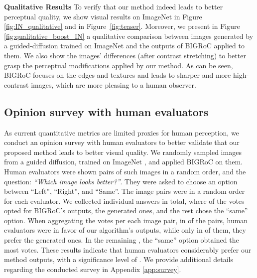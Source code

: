 \documentclass[10pt]{article} \usepackage[accepted]{tmlr}
\begin{document}
\noindent \textbf{Qualitative Results} To verify that our method indeed leads to better perceptual quality, we show visual results on ImageNet  in Figure \ref{fig:IN_qualitative} and in Figure~\ref{fig:teaser}. Moreover, we present in Figure \ref{fig:qualitative_boost_IN} a qualitative comparison between images generated by a guided-diffusion trained on ImageNet  and the outputs of BIGRoC applied to them. We also show the images' differences (after contrast stretching) to better grasp the perceptual modifications applied by our method. As can be seen, BIGRoC focuses on the edges and textures and leads to sharper and more high-contrast images, which are more pleasing to a human observer.



\subsection{Opinion survey with human evaluators}
As current quantitative metrics are limited proxies for human perception, we conduct an opinion survey with human evaluators to better validate that our proposed method leads to better visual quality.
We randomly sampled  images from a guided diffusion, trained on ImageNet , and applied BIGRoC on them.
Human evaluators were shown pairs of such images in a random order, and the question: \textit{``Which image looks better?''}. They were asked to choose an option between ``Left'', ``Right'', and ``Same''.
The image pairs were in a random order for each evaluator.
We collected  individual answers in total, where  of the votes opted for BIGRoC's outputs,  the generated ones, and the rest chose the ``same'' option.
When aggregating the votes per each image pair, in  of the pairs, human evaluators were in favor of our algorithm's outputs, while only in  of them, they prefer the generated ones. In the remaining , the ``same'' option obtained the most votes.
These results indicate that human evaluators considerably prefer our method outputs, with a significance level of . We provide additional details regarding the conducted survey in Appendix \ref{app:survey}.
\end{document}
